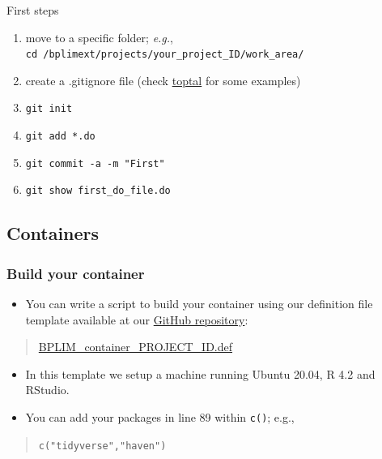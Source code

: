 \documentclass[
  11pt,
  a4paper,
]{article}
\providecommand{\tightlist}{%
  \setlength{\itemsep}{0pt}\setlength{\parskip}{0pt}}
\begin{document}
First steps

\begin{enumerate}
\def\labelenumi{\arabic{enumi}.}
\tightlist
\item
  move to a specific folder; \emph{e.g.},
  \texttt{cd\ /bplimext/projects/your\_project\_ID/work\_area/}
\item
  create a .gitignore file (check
  \href{https://www.toptal.com/developers/gitignore}{toptal} for some
  examples)
\item
  \texttt{git\ init}
\item
  \texttt{git\ add\ *.do}
\item
  \texttt{git\ commit\ -a\ -m\ "First"}
\item
  \texttt{git\ show\ first\_do\_file.do}
\end{enumerate}

\hypertarget{containers}{%
\subsection{Containers}\label{containers}}

\hypertarget{build-your-container}{%
\subsubsection{Build your container}\label{build-your-container}}

\begin{itemize}
\tightlist
\item
  You can write a script to build your container using our definition
  file template available at our
  \href{https://github.com/BPLIM/Manuals/tree/master/ExternalServer}{GitHub
  repository}:
\end{itemize}

\begin{quote}
\href{https://github.com/BPLIM/Manuals/tree/master/ExternalServer/Containers/1.R_RStudio/BPLIM_container_PROJECT_ID.def}{BPLIM\_container\_PROJECT\_ID.def}
\end{quote}

\begin{itemize}
\item
  In this template we setup a machine running Ubuntu 20.04, R 4.2 and
  RStudio.
\item
  You can add your packages in line 89 within \texttt{c()}; e.g.,
\end{itemize}

\begin{quote}
\texttt{c("tidyverse","haven")}
\end{quote}
\end{document}
